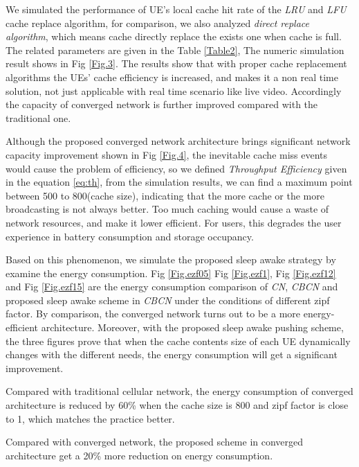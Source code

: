 \documentclass[conference]{IEEEtran}
\begin{document}

We simulated the performance of UE's local cache hit rate of the \emph{LRU} and \emph{LFU} cache replace algorithm, for comparison, we also analyzed \emph{direct replace algorithm}, which means cache directly replace the exists one when cache is full. The related parameters are given in the Table \ref{Table2}, The numeric simulation result shows in Fig \ref{Fig.3}. The results show that with proper cache replacement algorithms the UEs' cache efficiency is increased, and makes it a non real time solution, not just applicable with real time scenario like live video.  Accordingly the capacity of converged network is further improved compared with the traditional one.

Although the proposed converged network architecture brings significant network capacity improvement shown in Fig \ref{Fig.4}, the inevitable cache miss events would cause the problem of efficiency, so we defined \emph{Throughput Efficiency} given in the equation \eqref{eq:th}, from the simulation results, we can find a maximum point between 500 to 800(cache size), indicating that the more cache or the more broadcasting is not always better. Too much caching would cause a waste of network resources, and make it lower efficient. For users, this degrades the user experience in battery consumption and storage occupancy. 

Based on this phenomenon, we simulate the proposed sleep awake strategy by examine the energy consumption. Fig \ref{Fig.ezf05} Fig \ref{Fig.ezf1}, Fig \ref{Fig.ezf12} and Fig \ref{Fig.ezf15} are the  energy consumption comparison of \emph{CN}, \emph{CBCN} and proposed sleep awake scheme in \emph{CBCN} under the conditions of different zipf factor. By comparison, the converged network turns out to be a more energy-efficient architecture. Moreover, with the proposed sleep awake pushing scheme, the three figures prove that when the cache contents size of each UE dynamically changes with the different needs, the energy consumption will get a significant improvement. 

Compared with traditional cellular network, the energy consumption of converged architecture is reduced by 60\% when the cache size is 800 and zipf factor is close to 1, which matches the practice better. 

Compared with converged network, the proposed scheme in converged architecture get a 20\% more reduction on energy consumption.
\end{document}

